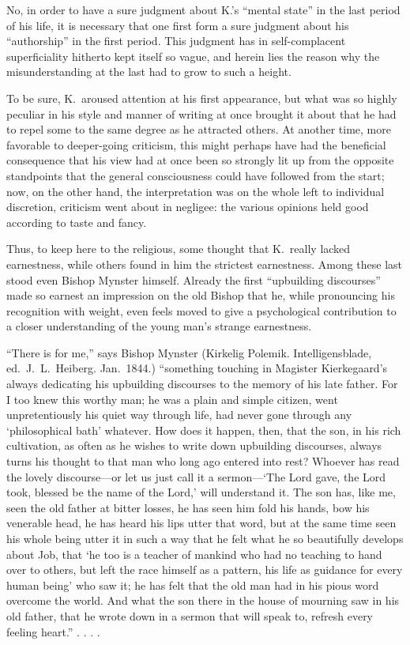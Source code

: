 \documentclass[12pt,a4paper]{article}
\newcommand{\opage}[1]{\marginnote{\footnotesize\textit{[#1]}}}
\begin{document}
No, in order to have a sure judgment about K.'s ``mental
state'' in the last period of his life, it is necessary
that one first form a sure judgment about his
``authorship'' in the first period. This judgment
has in self-complacent superficiality hitherto kept itself so
vague, and herein lies the reason why the misunderstanding
at the last had to grow to such a height.

To be sure, K.\ aroused attention at his first appearance,
but what was so highly peculiar in his style and manner of writing
at once brought it about that he had to repel some
to the same degree as he attracted others. At
another time, more favorable to deeper-going criticism,
this might perhaps have had the beneficial
\opage{5}
consequence that his view had at once been so strongly lit
up from the opposite standpoints that the general
consciousness could have followed from the start; now,
on the other hand, the interpretation was on the whole left to individual
discretion, criticism went about in negligee: the various
opinions held good according to taste and fancy.

Thus, to keep here to the religious, some
thought that K.\ really lacked earnestness, while others
found in him the strictest earnestness. Among these last
stood even Bishop Mynster himself. Already the first
``upbuilding discourses'' made so earnest an impression on
the old Bishop that he, while pronouncing his recognition with weight,
even feels moved to give a
psychological contribution to a closer understanding of the young
man's strange earnestness.

``There is for me,'' says Bishop Mynster (Kirkelig Polemik.
Intelligensblade, ed.\ J.\ L.\ Heiberg. Jan.\ 1844.)
``something touching in Magister Kierkegaard's always dedicating his
upbuilding discourses to the memory of his late father. For I
too knew this worthy man; he was a plain and simple
citizen, went unpretentiously his quiet way through
life, had never gone through any
`philosophical bath' whatever. How does it happen, then, that the son,
in his rich cultivation, as often as he wishes to write down upbuilding
discourses, always turns his thought to that man who
long ago entered into rest? Whoever has read
the lovely discourse---or let us just call it a sermon---`The
Lord gave, the Lord took, blessed be
the name of the Lord,' will understand it. The son has, like me, seen
the old father at bitter losses, he has seen him fold
his hands, bow his venerable head, he has heard
his lips utter that word, but at the same time seen his whole
being utter it in such a way that he felt
what he so beautifully develops about Job, that `he too is
a teacher of mankind who had no teaching to hand
over to others, but left the race himself as a
\opage{6}
pattern, his life as guidance for every human being'
who saw it; he has felt that the old man had in his
pious word overcome the world. And what the son there
in the house of mourning saw in his old father, that he wrote down
in a sermon that will speak to, refresh every feeling
heart.'' . . . .
\end{document}
